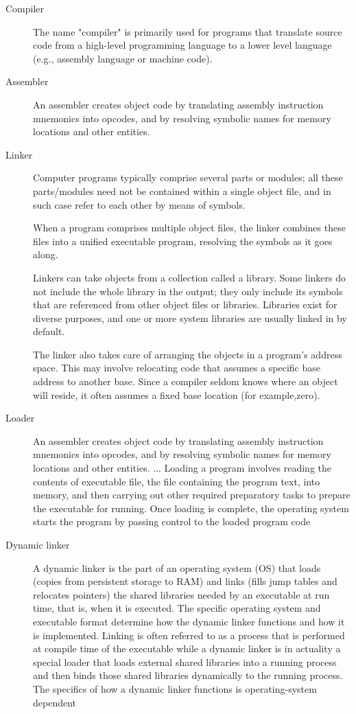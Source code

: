 \begin{description}
\item[Compiler] The name "compiler" is primarily used for programs that translate source
  code from a high-level programming language to a lower level language (e.g., assembly
  language or machine code).
\item[Assembler] An assembler creates object code by translating assembly instruction
  mnemonics into opcodes, and by resolving symbolic names for memory locations and other
  entities.
\item[Linker] Computer programs typically comprise several parts or modules; all these
  parts/modules need not be contained within a single object file, and in such case refer
  to each other by means of symbols.

  When a program comprises multiple object files, the linker combines these files into a
  unified executable program, resolving the symbols as it goes along.

  Linkers can take objects from a collection called a library. Some linkers do not include
  the whole library in the output; they only include its symbols that are referenced from
  other object files or libraries. Libraries exist for diverse purposes, and one or more
  system libraries are usually linked in by default.

  The linker also takes care of arranging the objects in a program's address space. This
  may involve relocating code that assumes a specific base address to another base. Since
  a compiler seldom knows where an object will reside, it often assumes a fixed base
  location (for example,zero).
\item[Loader] An assembler creates object code by translating assembly instruction
  mnemonics into opcodes, and by resolving symbolic names for memory locations and other
  entities. ... Loading a program involves reading the contents of executable file, the
  file containing the program text, into memory, and then carrying out other required
  preparatory tasks to prepare the executable for running. Once loading is complete, the
  operating system starts the program by passing control to the loaded program
  code
\item[Dynamic linker] A dynamic linker is the part of an operating system (OS) that loads
  (copies from persistent storage to RAM) and links (fills jump tables and relocates
  pointers) the shared libraries needed by an executable at run time, that is, when it is
  executed. The specific operating system and executable format determine how the dynamic
  linker functions and how it is implemented. Linking is often referred to as a process
  that is performed at compile time of the executable while a dynamic linker is in
  actuality a special loader that loads external shared libraries into a running process
  and then binds those shared libraries dynamically to the running process. The specifics
  of how a dynamic linker functions is operating-system
  dependent
\end{description}

